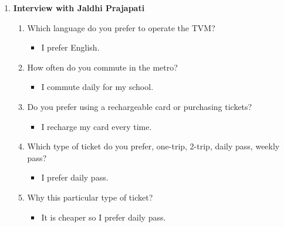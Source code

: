 \documentclass[15pt]{article}
\begin{document}
\begin{appendices}
\begin{enumerate}[leftmargin=3em, itemsep=0pt, parsep=0pt, , font=\Large\bfseries]
    
    \vspace{0.2cm}   
    \item {\Large\bfseries Interview with Jaldhi Prajapati}\\
    \begin{enumerate}[leftmargin=2em, itemsep=0pt, parsep=0pt, , font=\Large\bfseries]
        \item {\Large Which language do you prefer to operate the TVM?}
        \vspace{0.1cm}
            \begin{itemize}
                \item {\Large I prefer English.}
            \end{itemize}
            \vspace{0.2cm}
        \item {\Large How often do you commute in the metro?}
        \vspace{0.1cm}
            \begin{itemize}
                \item {\Large I commute daily for my school.}
            \end{itemize}
            \vspace{0.2cm}
        \item {\Large Do you prefer using a rechargeable card or purchasing tickets?}
        \vspace{0.1cm}
            \begin{itemize}
                \item {\Large  I recharge my card every time.}
            \end{itemize}
            \vspace{0.2cm}
        \item {\Large Which type of ticket do you prefer, one-trip, 2-trip, daily pass, weekly pass?}
        \vspace{0.1cm}
            \begin{itemize}
                \item {\Large I prefer daily pass.}
            \end{itemize}
            \vspace{0.2cm}
        \item {\Large Why this particular type of ticket?}
        \vspace{0.1cm}
            \begin{itemize}
                \item {\Large  It is cheaper so I prefer daily pass.}

\end{itemize}
\end{enumerate}
\end{enumerate}
\end{appendices}
\end{document}
